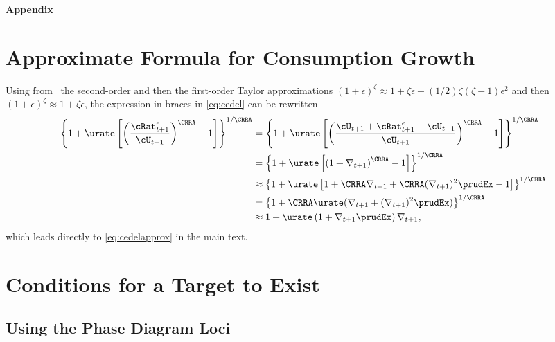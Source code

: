 \documentclass{\handout}
\begin{document}
\label{sec:PFwhenFHWfails}
\pagebreak\appendix
\centerline{\bf \LARGE Appendix}\medskip

\setcounter{section}{0}

\section{Approximate Formula for Consumption Growth}\label{sec:CGroApprox}

Using from \MathFactsList ~the second-order and then the first-order
Taylor approximations  \TaylorTwo $(1+\epsilon)^{\zeta} \approx 1 + \zeta \epsilon +
(1/2)\zeta(\zeta-1) \epsilon^{2}$ and then \TaylorOne $(1+\epsilon)^{\zeta} \approx 1 + \zeta \epsilon$, the expression in braces
in \eqref{eq:cedel} can be rewritten
\begin{equation}\begin{gathered}\begin{aligned}
        \left\{1+\urate\left[\left(\frac{{\cRat}^{e}_{t+1}}{\cU_{t+1}}\right)^{\CRRA}-1\right]\right\}^{1/\CRRA} & =  \left\{1+\urate\left[\left(\frac{\cU_{t+1}+{\cRat}^{e}_{t+1}-\cU_{t+1}}{\cU_{t+1}}\right)^{\CRRA}-1\right]\right\}^{1/\CRRA} \notag
\\      & =  \left\{1+\urate\left[\left(1+\nabla _{t+1}\right)^{\CRRA}-1\right]\right\}^{1/\CRRA} \notag
\\      & \approx       \left\{1+\urate\left[1+\CRRA \nabla _{t+1}+ \CRRA (\nabla _{t+1})^{2}\prudEx-1\right]\right\}^{1/\CRRA} \notag 
\\ & =          \left\{1+ \CRRA \urate (\nabla _{t+1}+ (\nabla _{t+1})^{2}\prudEx)\right\}^{1/\CRRA} \notag
\\ & \approx  1+ \urate  \left(1+\nabla _{t+1}\prudEx\right)\nabla _{t+1}, \notag
\end{aligned}\end{gathered}\end{equation}
which leads directly to \eqref{eq:cedelapprox} in the main text.


\section{Conditions for a Target to Exist}\label{sec:mTargExists}

\subsection{Using the Phase Diagram Loci} 
 
\end{document}
